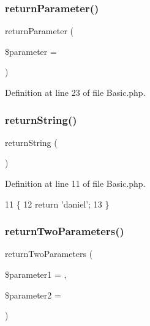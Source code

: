 \subsubsection{\texorpdfstring{return\+Parameter()}{returnParameter()}}
{\footnotesize\ttfamily return\+Parameter (\begin{DoxyParamCaption}\item[{}]{\$parameter = {\ttfamily \textquotesingle{}\textquotesingle{}} }\end{DoxyParamCaption})}



Definition at line 23 of file Basic.\+php.


\hypertarget{class_basic_a5bb666dcea19a9561c2047cfa25936bd}{}\label{class_basic_a5bb666dcea19a9561c2047cfa25936bd} 
\subsubsection{\texorpdfstring{return\+String()}{returnString()}}
{\footnotesize\ttfamily return\+String (\begin{DoxyParamCaption}{ }\end{DoxyParamCaption})}



Definition at line 11 of file Basic.\+php.


\begin{DoxyCode}
11                                    \{
12         \textcolor{keywordflow}{return} \textcolor{stringliteral}{'daniel'};
13     \}
\end{DoxyCode}
\hypertarget{class_basic_a2ef87b96abcca966a41e34d077fcc38e}{}\label{class_basic_a2ef87b96abcca966a41e34d077fcc38e} 
\subsubsection{\texorpdfstring{return\+Two\+Parameters()}{returnTwoParameters()}}
{\footnotesize\ttfamily return\+Two\+Parameters (\begin{DoxyParamCaption}\item[{}]{\$parameter1 = {\ttfamily \textquotesingle{}\textquotesingle{}},  }\item[{}]{\$parameter2 = {\ttfamily \textquotesingle{}\textquotesingle{}} }\end{DoxyParamCaption})}



